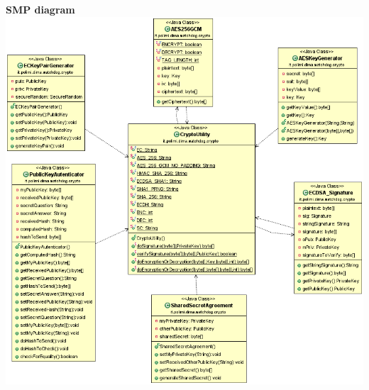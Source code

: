 \begin{center}
\textbf{SMP diagram}\\
\includegraphics[scale=0.5]{images/smp}
\end{center}
\newpage
